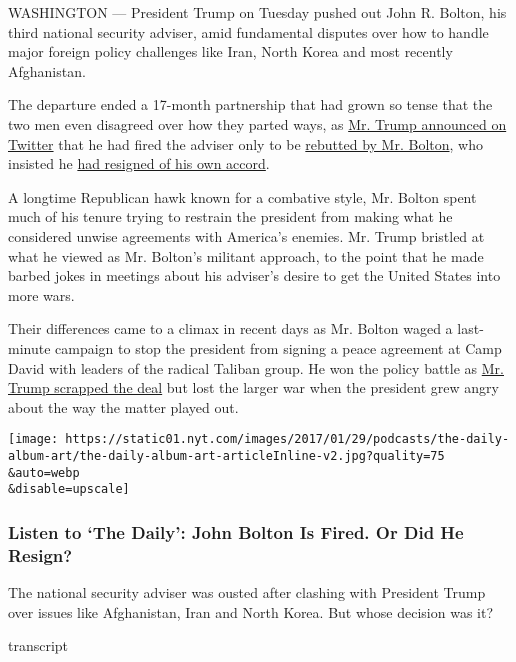 WASHINGTON --- President Trump on Tuesday pushed out John R. Bolton, his
third national security adviser, amid fundamental disputes over how to
handle major foreign policy challenges like Iran, North Korea and most
recently Afghanistan.

The departure ended a 17-month partnership that had grown so tense that
the two men even disagreed over how they parted ways, as
\href{https://twitter.com/realDonaldTrump/status/1171452880055746560}{Mr.
Trump announced on Twitter} that he had fired the adviser only to be
\href{https://twitter.com/AmbJohnBolton/status/1171455806069305346?s=20}{rebutted
by Mr. Bolton}, who insisted he
\href{https://int.nyt.com/data/documenthelper/1697-bolton-resignation-letter/1efe19fa7a0e6a93abd9/optimized/full.pdf\#page=1}{had
resigned of his own accord}.

A longtime Republican hawk known for a combative style, Mr. Bolton spent
much of his tenure trying to restrain the president from making what he
considered unwise agreements with America's enemies. Mr. Trump bristled
at what he viewed as Mr. Bolton's militant approach, to the point that
he made barbed jokes in meetings about his adviser's desire to get the
United States into more wars.

Their differences came to a climax in recent days as Mr. Bolton waged a
last-minute campaign to stop the president from signing a peace
agreement at Camp David with leaders of the radical Taliban group. He
won the policy battle as
\href{https://twitter.com/realDonaldTrump/status/1170469618177236992?s=20}{Mr.
Trump scrapped the deal} but lost the larger war when the president grew
angry about the way the matter played out.

\texttt{[image: https://static01.nyt.com/images/2017/01/29/podcasts/the-daily-album-art/the-daily-album-art-articleInline-v2.jpg?quality=75\\\&auto=webp\\\&disable=upscale]}

\hypertarget{listen-to-the-daily-john-bolton-is-fired-or-did-he-resign}{%
\subsubsection{Listen to `The Daily': John Bolton Is Fired. Or Did He
Resign?}\label{listen-to-the-daily-john-bolton-is-fired-or-did-he-resign}}

The national security adviser was ousted after clashing with President
Trump over issues like Afghanistan, Iran and North Korea. But whose
decision was it?

transcript

